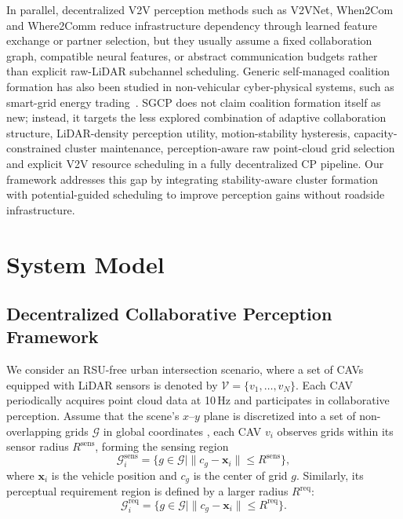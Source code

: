 \documentclass[conference]{IEEEtran}
\begin{document}
In parallel, decentralized V2V perception methods such as V2VNet, When2Com and Where2Comm reduce infrastructure dependency through learned feature exchange or partner selection, but they usually assume a fixed collaboration graph, compatible neural features, or abstract communication budgets rather than explicit raw-LiDAR subchannel scheduling. Generic self-managed coalition formation has also been studied in non-vehicular cyber-physical systems, such as smart-grid energy trading~\cite{aslam2024smartform}. SGCP does not claim coalition formation itself as new; instead, it targets the less explored combination of adaptive collaboration structure, LiDAR-density perception utility, motion-stability hysteresis, capacity-constrained cluster maintenance, perception-aware raw point-cloud grid selection and explicit V2V resource scheduling in a fully decentralized CP pipeline. Our framework addresses this gap by integrating stability-aware cluster formation with potential-guided scheduling to improve perception gains without roadside infrastructure.

\section{System Model}
\subsection{Decentralized Collaborative Perception Framework}
\label{sec:system_model}
We consider an RSU-free urban intersection scenario,  where a set of CAVs equipped with LiDAR sensors is denoted by $\mathcal{V} = \{v_1, \dots, v_N\}$. 
Each CAV periodically acquires point cloud data at 10\,Hz and participates in collaborative perception. 
Assume that the scene’s $x$–$y$ plane is discretized into a set of non-overlapping grids $\mathcal{G}$ in global coordinates \cite{luo2023edgecooper}\cite{liang2025fullperception}, each CAV $v_i$ observes grids within its sensor radius $R^{\mathrm{sens}}$, forming the sensing region
\begin{equation}
\mathcal{G}_i^{\mathrm{sens}} = \{ g \in \mathcal{G} \mid \|c_g - \mathbf{x}_i\| \leq R^{\mathrm{sens}} \},
\end{equation}
where $\mathbf{x}_i$ is the vehicle position and $c_g$ is the center of grid $g$. 
Similarly, its perceptual requirement region is defined by a larger radius $R^{\mathrm{req}}$:
\begin{equation}
\mathcal{G}_i^{\mathrm{req}} = \{ g \in \mathcal{G} \mid \|c_g - \mathbf{x}_i\| \leq R^{\mathrm{req}} \}.
\end{equation}
\end{document}
